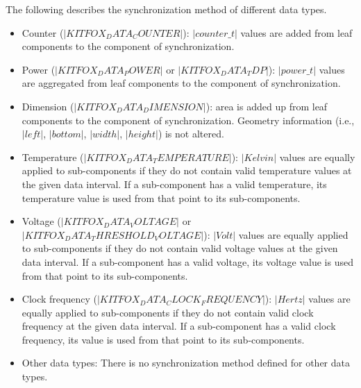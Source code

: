 \noindent
The following describes the synchronization method of different data types.

\begin{itemize}
\item{Counter ($|KITFOX_DATA_COUNTER|$): $|counter\_t|$ values are added from leaf components to the component of synchronization.} \vspace*{-5pt}\leavevmode
\item{Power ($|KITFOX_DATA_POWER|$ or $|KITFOX_DATA_TDP|$): $|power\_t|$ values are aggregated from leaf components to the component of synchronization.} \vspace*{-5pt}\leavevmode
\item{Dimension ($|KITFOX_DATA_DIMENSION|$): area is added up from leaf components to the component of synchronization. Geometry information (i.e., $|left|$, $|bottom|$, $|width|$, $|height|$) is not altered.} \vspace*{-5pt}\leavevmode
\item{Temperature ($|KITFOX_DATA_TEMPERATURE|$): $|Kelvin|$ values are equally applied to sub-components if they do not contain valid temperature values at the given data interval. If a sub-component has a valid temperature, its temperature value is used from that point to its sub-components.} \vspace*{-5pt}\leavevmode
\item{Voltage ($|KITFOX_DATA_VOLTAGE|$ or $|KITFOX_DATA_THRESHOLD_VOLTAGE|$): $|Volt|$ values are equally applied to sub-components if they do not contain valid voltage values at the given data interval. If a sub-component has a valid voltage, its voltage value is used from that point to its sub-components.} \vspace*{-5pt}\leavevmode
\item{Clock frequency ($|KITFOX_DATA_CLOCK_FREQUENCY|$): $|Hertz|$ values are equally applied to sub-components if they do not contain valid clock frequency at the given data interval. If a sub-component has a valid clock frequency, its value is used from that point to its sub-components.} \vspace*{-5pt}\leavevmode
\item{Other data types: There is no synchronization method defined for other data types.}
\end{itemize}

